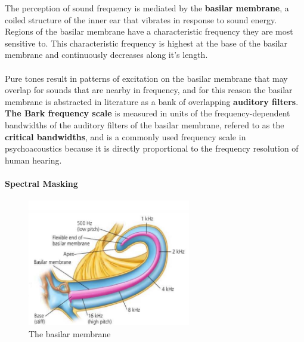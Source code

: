 The perception of sound frequency is mediated by the \textbf{basilar membrane}, a coiled structure of the inner ear that vibrates in response 
to sound energy.
Regions of the basilar membrane have a characteristic frequency they are most sensitive to. This characteristic frequency is highest at the 
base of the basilar membrane and continuously decreases along it's length.
\paragraph{}
Pure tones result in patterns of excitation on the basilar membrane that may overlap for sounds that are nearby in frequency, and for this reason the 
basilar membrane is abstracted in literature as a bank of overlapping \textbf{auditory filters}.
\textbf{The Bark frequency scale} is measured in units of the frequency-dependent bandwidths of the auditory filters of the basilar membrane, refered 
to as the \textbf{critical bandwidths}, and is a commonly used frequency scale in psychoacoustics because it is directly proportional to the frequency 
resolution of human hearing.
\paragraph{Spectral Masking}
\begin{figure}
  \centerline{\includegraphics[width=2.8in]{figs/bmem}}
  \caption{The basilar membrane}
  \label{fig:basilarmembrane}
\end{figure}

